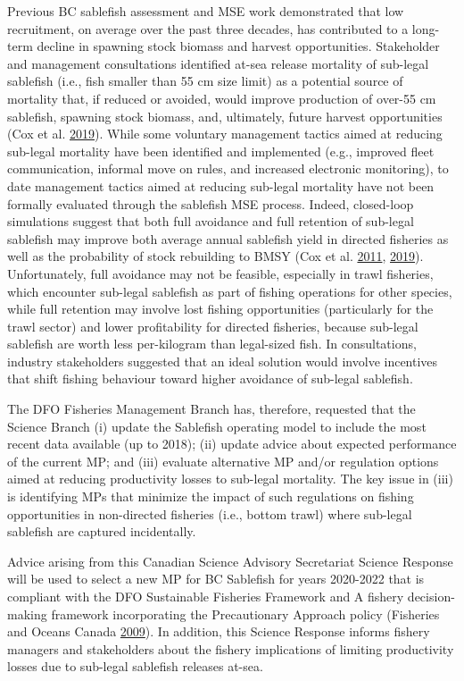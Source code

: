 \documentclass[11pt]{book}
\begin{document}
Previous BC sablefish assessment and MSE work demonstrated that low recruitment, on average over the past three decades, has contributed to a long-term decline in spawning stock biomass and harvest opportunities. Stakeholder and management consultations identified at-sea release mortality of sub-legal sablefish (i.e., fish smaller than 55 cm size limit) as a potential source of mortality that, if reduced or avoided, would improve production of over-55 cm sablefish, spawning stock biomass, and, ultimately, future harvest opportunities (Cox et al. \protect\hyperlink{ref-cox2019evaluating}{2019}). While some voluntary management tactics aimed at reducing sub-legal mortality have been identified and implemented (e.g., improved fleet communication, informal move on rules, and increased electronic monitoring), to date management tactics aimed at reducing sub-legal mortality have not been formally evaluated through the sablefish MSE process. Indeed, closed-loop simulations suggest that both full avoidance and full retention of sub-legal sablefish may improve both average annual sablefish yield in directed fisheries as well as the probability of stock rebuilding to BMSY (Cox et al. \protect\hyperlink{ref-cox2011management}{2011}, \protect\hyperlink{ref-cox2019evaluating}{2019}). Unfortunately, full avoidance may not be feasible, especially in trawl fisheries, which encounter sub-legal sablefish as part of fishing operations for other species, while full retention may involve lost fishing opportunities (particularly for the trawl sector) and lower profitability for directed fisheries, because sub-legal sablefish are worth less per-kilogram than legal-sized fish. In consultations, industry stakeholders suggested that an ideal solution would involve incentives that shift fishing behaviour toward higher avoidance of sub-legal sablefish.

The DFO Fisheries Management Branch has, therefore, requested that the Science Branch (i) update the Sablefish operating model to include the most recent data available (up to 2018); (ii) update advice about expected performance of the current MP; and (iii) evaluate alternative MP and/or regulation options aimed at reducing productivity losses to sub-legal mortality. The key issue in (iii) is identifying MPs that minimize the impact of such regulations on fishing opportunities in non-directed fisheries (i.e., bottom trawl) where sub-legal sablefish are captured incidentally.

Advice arising from this Canadian Science Advisory Secretariat Science Response will be used to select a new MP for BC Sablefish for years 2020-2022 that is compliant with the DFO Sustainable Fisheries Framework and A fishery decision-making framework incorporating the Precautionary Approach policy (Fisheries and Oceans Canada \protect\hyperlink{ref-DFO2009}{2009}). In addition, this Science Response informs fishery managers and stakeholders about the fishery implications of limiting productivity losses due to sub-legal sablefish releases at-sea.
\end{document}
